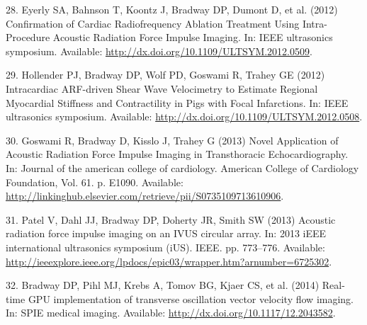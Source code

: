 \documentclass[letterpaper,10pt,english]{sphinxmanual}
\begin{document}
28. Eyerly SA, Bahnson T, Koontz J, Bradway DP, Dumont D, et al. (2012)
Confirmation of Cardiac Radiofrequency Ablation Treatment Using
Intra-Procedure Acoustic Radiation Force Impulse Imaging. In: IEEE
ultrasonics symposium. Available:
\href{http://dx.doi.org/10.1109/ULTSYM.2012.0509}{http://dx.doi.org/10.1109/ULTSYM.2012.0509}.

29. Hollender PJ, Bradway DP, Wolf PD, Goswami R, Trahey GE (2012)
Intracardiac ARF-driven Shear Wave Velocimetry to Estimate Regional
Myocardial Stiffness and Contractility in Pigs with Focal Infarctions.
In: IEEE ultrasonics symposium. Available:
\href{http://dx.doi.org/10.1109/ULTSYM.2012.0508}{http://dx.doi.org/10.1109/ULTSYM.2012.0508}.

30. Goswami R, Bradway D, Kisslo J, Trahey G (2013) Novel Application of
Acoustic Radiation Force Impulse Imaging in Transthoracic
Echocardiography. In: Journal of the american college of cardiology.
American College of Cardiology Foundation, Vol. 61. p. E1090. Available:
\href{http://linkinghub.elsevier.com/retrieve/pii/S0735109713610906}{http://linkinghub.elsevier.com/retrieve/pii/S0735109713610906}.

31. Patel V, Dahl JJ, Bradway DP, Doherty JR, Smith SW (2013) Acoustic
radiation force impulse imaging on an IVUS circular array. In: 2013 iEEE
international ultrasonics symposium (iUS). IEEE. pp. 773–776. Available:
\href{http://ieeexplore.ieee.org/lpdocs/epic03/wrapper.htm?arnumber=6725302}{http://ieeexplore.ieee.org/lpdocs/epic03/wrapper.htm?arnumber=6725302}.

32. Bradway DP, Pihl MJ, Krebs A, Tomov BG, Kjaer CS, et al. (2014)
Real-time GPU implementation of transverse oscillation vector velocity
flow imaging. In: SPIE medical imaging. Available:
\href{http://dx.doi.org/10.1117/12.2043582}{http://dx.doi.org/10.1117/12.2043582}.



\renewcommand{\indexname}{Index}
\printindex
\end{document}
